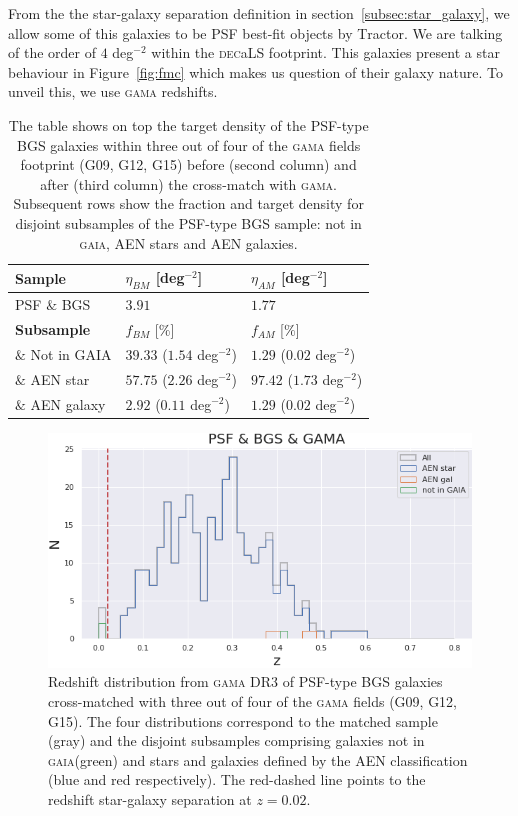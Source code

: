 \documentclass[fleqn,usenatbib]{mnras}
\newcommand{\DECaLS}{\textsc{dec}a\textsc{LS}\xspace}
\newcommand{\GAMA}{\textsc{gama}\xspace}
\newcommand{\GAIA}{\textsc{gaia}\xspace}
\newcommand{\TRACTOR}{\textsc{T}ractor\xspace}
\begin{document}
From the the star-galaxy separation definition in section~\ref{subsec:star_galaxy}, we allow some of this galaxies to be PSF best-fit objects by \TRACTOR. We are talking of the order of $4$ deg$^{-2}$ within the \DECaLS footprint. This galaxies present a star behaviour in Figure~\ref{fig:fmc} which makes us question of their galaxy nature. To unveil this, we use \GAMA redshifts. 

\begin{table}
\centering
\begin{tabular}{ |p{2cm}||p{2.5cm}|p{2.5cm}| }
 \hline
 {\bf Sample} & $\eta_{BM}$ [deg$^{-2}$] & $\eta_{AM}$ [deg$^{-2}$] \\
 \hline
 PSF $\&$ BGS & $3.91$ & $1.77$ \\
 \hline
 \hline
 {\bf Subsample} & $f_{BM}$ [$\%$] & $f_{AM}$ [$\%$] \\
 \hline
 $\&$ Not in GAIA  & $39.33$ ($1.54$ deg$^{-2}$) & $1.29$ ($0.02$ deg$^{-2}$) \\
 $\&$ AEN star  & $57.75$ ($2.26$ deg$^{-2}$) & $97.42$ ($1.73$ deg$^{-2}$) \\
 $\&$ AEN galaxy  & $2.92$ ($0.11$ deg$^{-2}$) & $1.29$ ($0.02$ deg$^{-2}$) \\
 \hline
\end{tabular}
\caption{The table shows on top the target density of the PSF-type BGS galaxies within three out of four of the \GAMA fields footprint (G09, G12, G15) before (second column) and after (third column) the cross-match with \GAMA. Subsequent rows show the fraction and target density for disjoint subsamples of the PSF-type BGS sample: not in \GAIA, AEN stars and AEN galaxies.}
\label{tab:bgs_psf_gama}
\end{table}

\begin{figure}
	\includegraphics[width=\columnwidth]{images/psf_bgs_gama_redshift}
    \caption{Redshift distribution from \GAMA DR3 of PSF-type BGS galaxies cross-matched with three out of four of the \GAMA fields (G09, G12, G15). The four distributions correspond to the matched sample (gray) and the disjoint subsamples comprising galaxies not in \GAIA (green) and stars and galaxies defined by the AEN classification (blue and red respectively). The red-dashed line points to the redshift star-galaxy separation at $z=0.02$.}
    \label{fig:matched_sample_z}
\end{figure}
\end{document}
